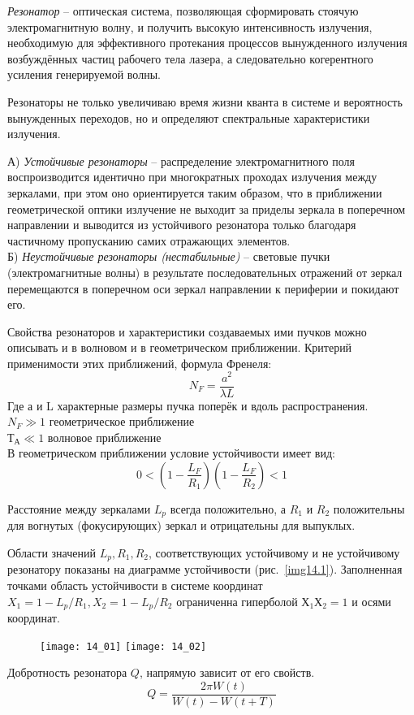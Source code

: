 
\emph{Резонатор} -- оптическая система, позволяющая сформировать стоячую 
электромагнитную волну, и получить высокую интенсивность излучения, 
необходимую для эффективного протекания процессов вынужденного излучения 
возбуждённых частиц рабочего тела лазера, а следовательно когерентного 
усиления генерируемой волны.

Резонаторы не только увеличиваю время жизни кванта в системе и вероятность 
вынужденных переходов, но и определяют спектральные характеристики излучения.

А) \emph{Устойчивые резонаторы} -- распределение электромагнитного поля 
воспроизводится идентично при многократных проходах излучения между зеркалами, 
при этом оно ориентируется таким образом, что в приближении геометрической 
оптики излучение не выходит за приделы зеркала в поперечном направлении и 
выводится из устойчивого резонатора только благодаря частичному пропусканию 
самих отражающих элементов. \\
Б) \emph{Неустойчивые резонаторы (нестабильные)} -- световые пучки 
(электромагнитные волны) в результате последовательных отражений от зеркал 
перемещаются в поперечном оси зеркал направлении к периферии и покидают его. 

Свойства резонаторов и характеристики создаваемых ими пучков можно описывать 
и в волновом и в геометрическом приближении. Критерий применимости этих 
приближений, формула Френеля:
\[
	N_F = \frac{a^2}{\lambda L}
\]
Где а и L характерные размеры пучка поперёк и вдоль распространения.\\
\( N_F \gg 1 \) геометрическое приближение \\
\( Т_А \ll 1 \) волновое приближение \\
В геометрическом приближении условие устойчивости имеет вид:
\[
	0 < \left(1-\frac{L_F}{R_1}\right)\left(1-\frac{L_F}{R_2}\right) < 1 
\]

Расстояние между зеркалами \( L_p \) всегда положительно, а \( R_1 \) и 
\( R_2 \) положительны для вогнутых (фокусирующих) зеркал и отрицательны для 
выпуклых.

Области значений \( L_p, R_1, R_2 \), соответствующих устойчивому и не 
устойчивому резонатору показаны на диаграмме устойчивости 
(рис.~\ref{img14.1}). Заполненная точками область устойчивости в системе 
координат \( X_1 = 1-L_p/R_1, X_2 = 1-L_p/R_2 \) ограниченна гиперболой 
\( Х_1 Х_2 = 1 \) и осями координат.
\begin{figure}[h]
    \center
    \texttt{[image: 14\_01]}
    \label{img14.1}\hfill
    \texttt{[image: 14\_02]}
    \label{img14.2}
\end{figure}

Добротность резонатора \( Q \), напрямую зависит от его свойств.
\[
	Q = \frac{2\pi W(t)}{W(t)-W(t+T)}
\]